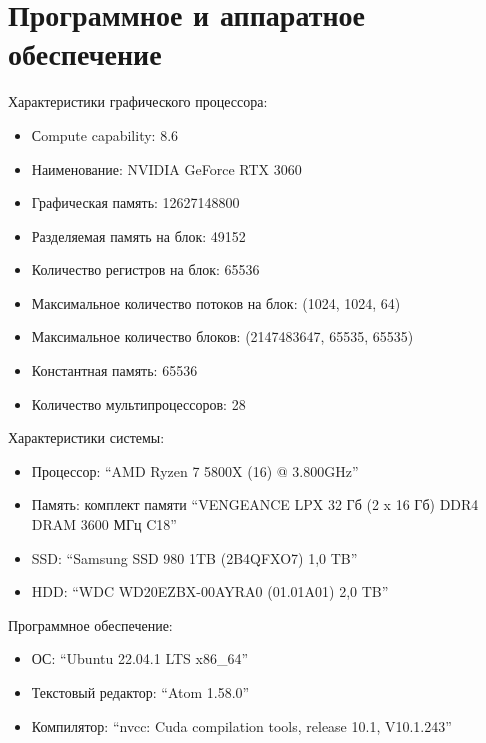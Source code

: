 \section{Программное и аппаратное обеспечение}
Характеристики графического процессора:
\begin{itemize}[noitemsep, topsep=0pt]
	\item Сompute capability: 8.6
    \item Наименование: NVIDIA GeForce RTX 3060
    \item Графическая память: 12627148800
	\item Разделяемая память на блок: 49152
	\item Количество регистров на блок: 65536
	\item Максимальное количество потоков на блок: (1024, 1024, 64)
	\item Максимальное количество блоков: (2147483647, 65535, 65535)
	\item Константная память: 65536
	\item Количество мультипроцессоров: 28
\end{itemize}

Характеристики системы:
\begin{itemize}[noitemsep, topsep=0pt]
	\item Процессор: \enquote{AMD Ryzen 7 5800X (16) @ 3.800GHz}
	\item Память: комплект памяти \enquote{VENGEANCE LPX 32 Гб (2 x 16 Гб) DDR4 DRAM 3600 МГц C18}
	\item SSD: \enquote{Samsung SSD 980 1TB (2B4QFXO7) 1,0 TB}
    \item HDD: \enquote{WDC WD20EZBX-00AYRA0 (01.01A01) 2,0 TB}
\end{itemize}

Программное обеспечение:
\begin{itemize}[noitemsep, topsep=0pt]
	\item ОС: \enquote{Ubuntu 22.04.1 LTS x86\_64}
	\item Текстовый редактор: \enquote{Atom 1.58.0}
	\item Компилятор: \enquote{nvcc: Cuda compilation tools, release 10.1, V10.1.243}
\end{itemize}
\pagebreak
